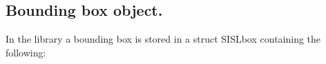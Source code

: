 

\subsection{Bounding box object.} \label{sec:bbox}

In the library a bounding box is stored in a struct SISLbox
containing the following:

\pgsbreak


